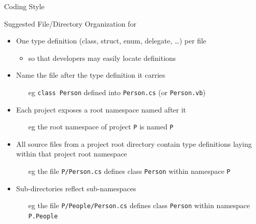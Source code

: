 \documentclass[presentation]{beamer}
\begin{document}
\begin{frame}{\csharp Coding Style}
    \begin{exampleblock}{Suggested File/Directory Organization for \dotnet}
        \begin{itemize}
            \item One type definition (class, struct, enum, delegate, \ldots) per file
            \begin{itemize}
                \item so that developers may easily locate definitions
            \end{itemize}
            \item Name the file after the type definition it carries
            \begin{itemize}
                \item[eg] \texttt{class Person} defined into \texttt{Person.cs} (or \texttt{Person.vb})
            \end{itemize}
            \item Each project exposes a \alert{root namespace} named after it
            \begin{itemize}
                \item[eg] the root namespace of project \texttt{P} is named \texttt{P}
            \end{itemize}
            \item All source files from a project root directory contain type definitions laying within that project root namespace
            \begin{itemize}
                \item[eg] the file \texttt{P/Person.cs} defines class \texttt{Person} within namespace \texttt{P}
            \end{itemize}
            \item Sub-directories reflect sub-namespaces
            \begin{itemize}
                \item[eg] the file \texttt{P/People/Person.cs} defines class \texttt{Person} within namespace \texttt{P.People}
            \end{itemize}
        \end{itemize}
    \end{exampleblock}

\end{frame}
\end{document}
